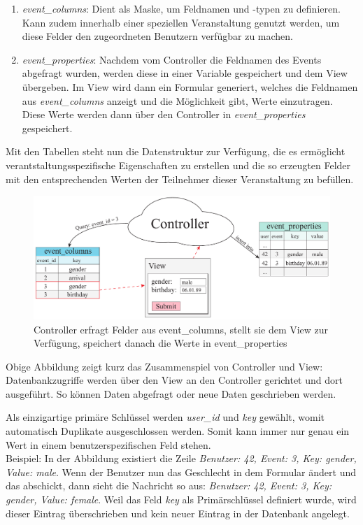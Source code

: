 \begin{enumerate} 
	\item \emph{event\_columns}: Dient als Maske, um Feldnamen und -typen zu definieren. Kann zudem innerhalb einer speziellen Veranstaltung genutzt werden, um diese Felder den zugeordneten Benutzern verfügbar zu machen.
	\item \emph{event\_properties}: Nachdem vom Controller die Feldnamen des Events abgefragt wurden, werden diese in einer Variable gespeichert und dem View übergeben. Im View wird dann ein Formular generiert, welches die Feldnamen aus \emph{event\_columns} anzeigt und die Möglichkeit gibt, Werte einzutragen. Diese Werte werden dann über den Controller in \emph{event\_properties} gespeichert.
\end{enumerate}

Mit den Tabellen steht nun die Datenstruktur zur Verfügung, die es ermöglicht verantstaltungsspezifische Eigenschaften zu erstellen und die so erzeugten Felder mit den entsprechenden Werten der Teilnehmer dieser Veranstaltung zu befüllen.

\begin{figure}[!ht]
	\centering
	\includegraphics[width=15cm]{fig/event_properties}
	\caption[Speichern von spez. Feldern in die Datenbank]{Controller erfragt Felder aus event\_columns, stellt sie dem View zur Verfügung, speichert danach die Werte in event\_properties}
\end{figure}

Obige Abbildung zeigt kurz das Zusammenspiel von Controller und View: Datenbankzugriffe werden über den View an den Controller gerichtet und dort ausgeführt. So können Daten abgefragt oder neue Daten geschrieben werden.\par

Als einzigartige primäre Schlüssel werden \emph{user\_id} und \emph{key} gewählt, womit automatisch Duplikate ausgeschlossen werden. Somit kann immer nur genau ein Wert in einem benutzerspezifischen Feld stehen.\\
Beispiel: In der Abbildung existiert die Zeile \emph{Benutzer: 42, Event: 3, Key: gender, Value: male}. Wenn der Benutzer nun das Geschlecht in dem Formular ändert und das abschickt, dann sieht die Nachricht so aus: \emph{Benutzer: 42, Event: 3, Key: gender, Value: female}. Weil das Feld \emph{key} als Primärschlüssel definiert wurde, wird dieser Eintrag überschrieben und kein neuer Eintrag in der Datenbank angelegt.

